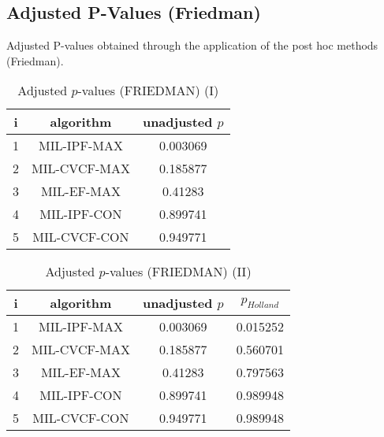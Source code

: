 \documentclass[a4paper,10pt]{article}
\begin{document}
\begin{landscape}
\newpage

\section{Adjusted P-Values (Friedman)}


Adjusted P-values obtained through the application of the post hoc methods (Friedman).

\begin{table}[!htp]
\centering\small
\begin{tabular}{ccc}
i&algorithm&unadjusted $p$\\
\hline1&MIL-IPF-MAX&0.003069\\2&MIL-CVCF-MAX&0.185877\\3&MIL-EF-MAX&0.41283\\4&MIL-IPF-CON&0.899741\\5&MIL-CVCF-CON&0.949771\\\hline
\end{tabular}
\caption{Adjusted $p$-values (FRIEDMAN) (I)}
\end{table}
\begin{table}[!htp]
\centering\small
\begin{tabular}{cccc}
i&algorithm&unadjusted $p$&$p_{Holland}$\\
\hline1&MIL-IPF-MAX&0.003069&0.015252\\2&MIL-CVCF-MAX&0.185877&0.560701\\3&MIL-EF-MAX&0.41283&0.797563\\4&MIL-IPF-CON&0.899741&0.989948\\5&MIL-CVCF-CON&0.949771&0.989948\\\hline
\end{tabular}
\caption{Adjusted $p$-values (FRIEDMAN) (II)}
\end{table}

\newpage
\end{landscape}
\end{document}
